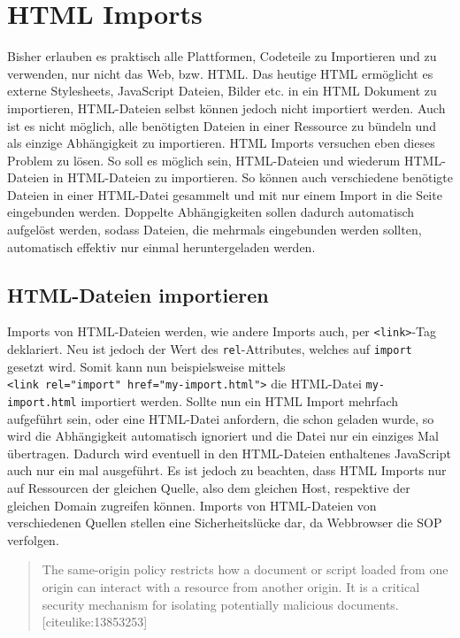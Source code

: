 \section{HTML Imports}\label{html-imports}

Bisher erlauben es praktisch alle Plattformen, Codeteile zu Importieren
und zu verwenden, nur nicht das Web, bzw. HTML. Das heutige HTML
ermöglicht es externe Stylesheets, JavaScript Dateien, Bilder etc. in
ein HTML Dokument zu importieren, HTML-Dateien selbst können jedoch
nicht importiert werden. Auch ist es nicht möglich, alle benötigten
Dateien in einer Ressource zu bündeln und als einzige Abhängigkeit zu
importieren. HTML Imports versuchen eben dieses Problem zu lösen. So
soll es möglich sein, HTML-Dateien und wiederum HTML-Dateien in
HTML-Dateien zu importieren. So können auch verschiedene benötigte
Dateien in einer HTML-Datei gesammelt und mit nur einem Import in die
Seite eingebunden werden. Doppelte Abhängigkeiten sollen dadurch
automatisch aufgelöst werden, sodass Dateien, die mehrmals eingebunden
werden sollten, automatisch effektiv nur einmal heruntergeladen werden.

\subsection{HTML-Dateien importieren}\label{html-dateien-importieren}

Imports von HTML-Dateien werden, wie andere Imports auch, per
\texttt{\textless{}link\textgreater{}}-Tag deklariert. Neu ist jedoch
der Wert des \texttt{rel}-Attributes, welches auf \texttt{import}
gesetzt wird. \cite[S. 139-147]{citeulike:13844975} Somit kann nun
beispielsweise mittels
\texttt{\textless{}link\ rel="import"\ href="my-import.html"\textgreater{}}
die HTML-Datei \texttt{my-import.html} importiert werden. Sollte nun ein
HTML Import mehrfach aufgeführt sein, oder eine HTML-Datei anfordern,
die schon geladen wurde, so wird die Abhängigkeit automatisch ignoriert
und die Datei nur ein einziges Mal übertragen. Dadurch wird eventuell in
den HTML-Dateien enthaltenes JavaScript auch nur ein mal ausgeführt. Es
ist jedoch zu beachten, dass HTML Imports nur auf Ressourcen der
gleichen Quelle, also dem gleichen Host, respektive der gleichen Domain
zugreifen können. Imports von HTML-Dateien von verschiedenen Quellen
stellen eine Sicherheitslücke dar, da Webbrowser die SOP verfolgen.

\begin{quote}
The same-origin policy restricts how a document or script loaded from
one origin can interact with a resource from another origin. It is a
critical security mechanism for isolating potentially malicious
documents. {[}citeulike:13853253{]}
\end{quote}

